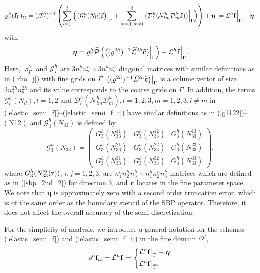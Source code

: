 \begin{equation}\label{elastic_semi_f_i}
{\varrho}^h_\Gamma ({\bf f}_\Gamma)_{tt} =
( {\mathcal{ J}}^{h}_\Gamma)^{-1}\left(\sum_{l=1}^3\Big(\big(\mathcal{G}_l^{h}({N}_{ll}){\bf f}\big)\Big|_\Gamma+\sum_{m=1,m\neq l}^3\big(\mathcal{D}_l^{h}(\mathcal{N}_{lm}^{h}\mathcal{D}_m^{h}{\bf f})\big)\Big|_\Gamma\Big) \right) + {\bm \eta} := \mathcal{L}^h{\bf f}\Big|_\Gamma + {\bm \eta},
\end{equation}
with 
\begin{equation}\label{eta}
{\bm \eta} = {\varrho}^h_{\Gamma}\wt{\mathcal{P}}\left(\big(({ \varrho}^{2h})^{-1}\wt{\mathcal{L}}^{2h} \wt{{\bf c}}\big)\Big|_{\Gamma}\right) - \mathcal{L}^{h}{\bf f}\Big|_{\Gamma}.
\end{equation}
Here, ${\varrho}^{h}_{\Gamma}$ and ${\mathcal{ J}}^{h}_{\Gamma}$ are $3n_1^hn_2^h\times 3n_1^hn_2^h$ diagonal matrices with similar definitions as in (\ref{rho_j}) with fine grids on $\Gamma$. $\big(({\varrho}^{2h})^{-1}\widetilde{L}^{2h} \widetilde{{\bf c}}\big)\big|_{\Gamma}$ is a colume vector of size $3n_1^{2h} n_2^{2h}$ and its value corresponds to the coarse grids on $\Gamma$. In addition, the terms $\mathcal{G}_l^h({N}_{ll}), l = 1,2$ and $\mathcal{D}_l^h(\mathcal{N}_{lm}^h\mathcal{D}_m^h), l=1,2,3,m=1,2,3,l\neq m$ in (\ref{elastic_semi_f})--(\ref{elastic_semi_f_i}) have similar definitions as in (\ref{g1122})--(\ref{N12}), and $\mathcal{G}_3^h({N}_{33})$ is defined by
\[ \mathcal{G}^{h}_3({N}_{33}) = \left(\begin{array}{ccc}
G_3^{h}(N_{33}^{11}) & G_3^{h}(N_{33}^{12})  & G_3^{h}(N_{33}^{13}) \\
G_3^{h}(N_{33}^{21}) & G_3^{h}(N_{33}^{22})  & G_3^{h}(N_{33}^{23}) \\
G_3^{h}(N_{33}^{31}) & G_3^{h}(N_{33}^{32})  & G_3^{h}(N_{33}^{33}) \end{array}\right),\]
where ${G}_3^{h}(N_{33}^{ij}({\bf r}))$, $i,j = 1,2,3$, are $n_1^{h}n_2^{h}n_3^{h}\times n_1^{h}n_2^{h}n_3^{h}$ matrices which are defined as in (\ref{sbp_2nd_2}) for direction $3$, and ${\bf r}$ locates in the fine parameter space. We note that $\bm \eta$ is approximately zero with a second order truncation error, which is of the same order as the boundary stencil of the SBP operator. Therefore, it does not affect the overall accuracy of the semi-discretization. 

For the simplicity of analysis, we introduce a general notation for the schemes (\ref{elastic_semi_f}) and (\ref{elastic_semi_f_i}) in the fine domain $\Omega^f$,
\begin{align}\label{fine_scheme}
{\varrho}^h{\bf f}_{tt} = \hat{\mathcal{L}}^h{\bf f} = \left\{
\begin{aligned}
&\mathcal{L}^h{\bf f}\big|_\Gamma +{\bm \eta}, \\
&\mathcal{L}^h{\bf f}\big|_{\overline{\Gamma}}.
\end{aligned}
\right.
\end{align}

